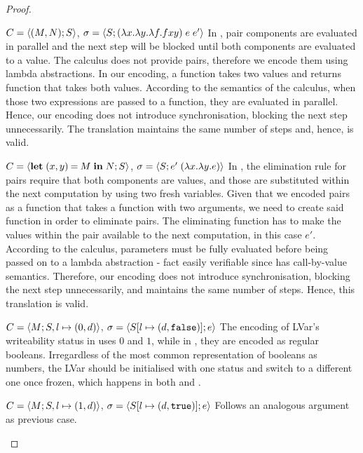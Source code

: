 \documentclass[main.tex]{subfiles}
\begin{document}
\begin{proof}
  \begin{case}{%
      $ C = \langle {\ensuremath{(M,N)}}; {S} \rangle$,
      $\sigma = \langle {S}; {(\lambda x. \lambda y.\lambda f. f x y)\;e\;e'} \rangle$}
    In \typedlambdalvar, pair components are evaluated in parallel and the next step will be blocked until both components are evaluated to a value. The \lambdalvar calculus does not provide pairs, therefore we encode them using lambda abstractions. In our encoding, a function takes two values and returns function that takes both values. According to the semantics of the \lambdalvar  calculus, when those two expressions are passed to a function, they are evaluated in parallel. Hence, our encoding does not introduce synchronisation, blocking the next step unnecessarily. The translation maintains the same number of steps and, hence, is valid.
  \end{case}

  \begin{case}{%
      $C = \langle {\ensuremath{\mathbf{let}\;(x,y)\mathbin{=}M\;\mathbf{in}\;N}}; {S} \rangle$,
      $\sigma = \langle {S}; {e' \;(\lambda x.\lambda y. e)} \rangle$}
    In \typedlambdalvar, the elimination rule for pairs require that both components are values, and those are substituted within the next computation by using two fresh variables. Given that we encoded pairs as a function that takes a function with two arguments, we need to create said function in order to eliminate pairs. The eliminating function has to make the values within the pair available to the next computation, in this case $e'$. According to the \lambdalvar calculus, parameters must be fully evaluated before being passed on to a lambda abstraction - fact easily verifiable since \lambdalvar has call-by-value semantics. Therefore, our encoding does not introduce synchronisation, blocking the next step unnecessarily, and maintains the same number of steps. Hence, this translation is valid.
  \end{case}

  \begin{case}{%
      $C = \langle {M}; {S, l \mapsto (0, d)} \rangle$,
      $\sigma = \langle {S[l \mapsto (d, \tt{false})]}; {e} \rangle$}
    The encoding of LVar's writeability status in \typedlambdalvar uses $0$ and $1$,
    while in \lambdalvar, they are encoded as regular booleans. Irregardless of the most
    common representation of booleans as numbers, the LVar should be initialised
    with one status and switch to a different one once frozen, which happens in
    both \lambdalvar and \typedlambdalvar.
  \end{case}

  \begin{case}{%
      $C = \langle {M}; {S, l \mapsto (1, d)} \rangle$,
      $ \sigma = \langle {S[l \mapsto (d, \tt{true})]}; {e} \rangle$}
    Follows an analogous argument as previous case.
  \end{case}

\end{proof}
\end{document}
